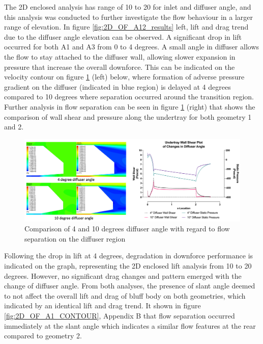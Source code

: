\noindent The 2D enclosed analysis has range of 10 to 20 for inlet and diffuser angle, and this analysis was conducted to further investigate the flow behaviour in a larger range of elevation. In figure \ref{fig:2D_OF_A12_results} left, lift and drag trend due to the diffuser angle elevation can be observed. A significant drop in lift occurred for both A1 and A3 from 0 to 4 degrees. A small angle in diffuser allows the flow to stay attached to the diffuser wall, allowing slower expansion in pressure that increase the overall downforce. This can be indicated on the velocity contour on figure \ref{fig:2D_OF_10_4_Contour_compare} (left) below, where formation of adverse pressure gradient on the diffuser  (indicated in blue region) is delayed at 4 degrees compared to 10 degrees where separation occurred around the transition region. Further analysis in flow separation can be seen in figure \ref{fig:2D_OF_10_4_Contour_compare} (right)  that shows the comparison of wall shear and pressure along the undertray for both geometry 1 and 2. 


\begin{figure}[!htb]
    \centering
    \includegraphics[scale=0.55]{Figures/2D_OF/10_4_O_COMPARE CONTOUR.PNG}
    \caption{Comparison of 4 and 10 degrees diffuser angle with regard to flow separation on the diffuser region }
    \label{fig:2D_OF_10_4_Contour_compare}
\end{figure}

\noindent Following the drop in lift at 4 degrees, degradation in downforce performance is indicated on the graph, representing the 2D enclosed lift analysis from 10 to 20 degrees. However, no significant drag changes and pattern emerged with the change of diffuser angle. From both analyses, the presence of slant angle deemed to not affect the overall lift and drag of bluff body on both geometries, which indicated by an identical lift and drag trend. It shown in figure \ref{fig:2D_OF_A1_CONTOUR}, Appendix B that flow separation occurred immediately at the slant angle which indicates a similar flow features at the rear compared to geometry 2. 

